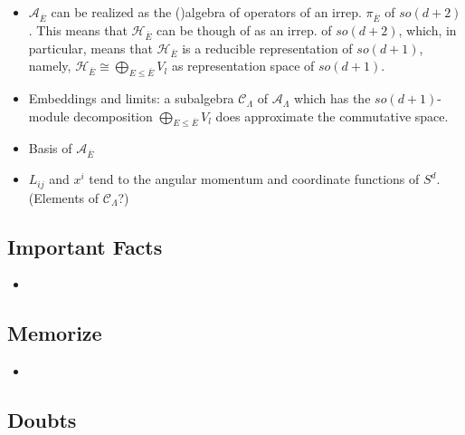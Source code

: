 \documentclass{article}
\newcommand{\cut}[1]{\overline{#1}}
\begin{document}
\begin{itemize}
    \item $\mathcal A_{\cut{E}}$ can be realized as the ()algebra of operators of an irrep. $\pi_{\cut{E}}$ of $so(d+2)$. This means that $\mathcal H_{\cut{E}}$ can be though of as an irrep. of $so(d+2)$, which, in particular, means that $\mathcal H_{\cut{E}}$ is a reducible representation of $so(d+1)$, namely, $\mathcal H_{\cut{E}} \cong \bigoplus_{E \leq \cut{E}} V_l$ as representation space of $so(d+1)$.
    
    \item Embeddings and limits: a subalgebra $\mathcal C_\Lambda$ of $\mathcal A_{\Lambda}$ which has the $so(d+1)$-module decomposition $\bigoplus_{E \leq \cut{E}} V_l$ does approximate the commutative space.
    
    \item Basis of $\mathcal A_{\cut{E}}$
    
    \item $L_{ij}$ and $x^i$ tend to the angular momentum and coordinate functions of $S^d$. (Elements of $\mathcal C_\Lambda$?)
    
    \end{itemize}

\subsection{Important Facts}

    \begin{itemize}

    \item 
    
    \end{itemize}

\subsection{Memorize}

    \begin{itemize}

    \item 
    
    \end{itemize}

\subsection{Doubts}
\end{document}
